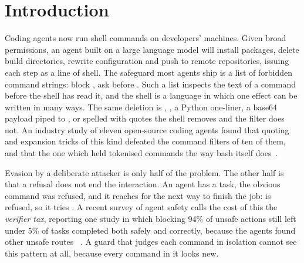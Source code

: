 \section{Introduction}\label{sec:intro}

Coding agents now run shell commands on developers' machines. Given broad permissions, an agent
built on a large language model will install packages, delete build directories, rewrite
configuration and push to remote repositories, issuing each step as a line of shell. The
safeguard most agents ship is a list of forbidden command strings: block , ask
before . Such a list inspects the text of a command before the shell has read it, and
the shell is a language in which one effect can be written in many ways. The same deletion is
, , a Python one-liner, a base64 payload piped to ,
or  spelled with quotes the shell removes and the filter does not. An industry study of
eleven open-source coding agents found that quoting and expansion tricks of this kind defeated
the command filters of ten of them, and that the one which held tokenised commands the way bash
itself does~\cite{guardfall}.

Evasion by a deliberate attacker is only half of the problem. The other half is that a refusal
does not end the interaction. An agent has a task, the obvious command was refused, and it
reaches for the next way to finish the job:  is refused, so it tries .
A recent survey of agent safety calls the cost of this the \emph{verifier tax}, reporting one
study in which blocking 94\% of unsafe actions still left under 5\% of tasks completed both
safely and correctly, because the agents found other unsafe routes~\cite{survey-safe-agents}%
. A guard that
judges each command in isolation cannot see this pattern at all, because every command in it
looks new.

